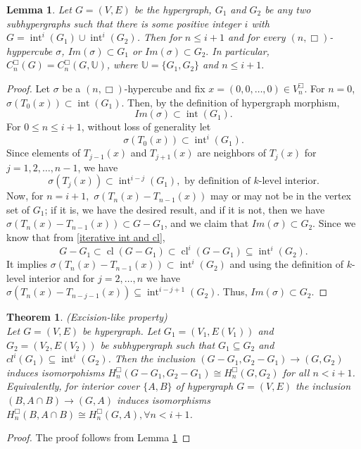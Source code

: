 \documentclass[11pt]{amsart}
\newtheorem{thm}{Theorem}[section]
\newtheorem{lem}[subsection]{Lemma}
\newcommand{\cl}{\operatorname{cl}}
\renewcommand{\int}{\operatorname{int}}
\begin{document}
\begin{lem}\label{lemma box excision-like}
Let $G=(V,E)$ be the hypergraph, $G_1$ and $G_2$ be any two subhypergraphs such that there is some positive integer $i$ with  $G=\int^i(G_1)\cup \int^i(G_2)$. Then for $n\leq i+1$ and for every $(n,\Box)$-hyppercube $\sigma$, $Im(\sigma)\subset G_1$ or $Im(\sigma) \subset G_2.$ In particular, $C_n^\Box(G)=C_n^\Box(G,\mathbb{U})$, where $\mathbb{U}=\{G_1,G_2\}$ and $n\leq i+1.$
\end{lem}
\begin{proof}
Let $\sigma$ be a $(n,\Box)$-hypercube and fix $x=(0,0,\ldots,0) \in V_n^\Box$. For $n=0$,  $\sigma(T_0(x)) \subset   \int(G_1)$.  
Then, by the definition of hypergraph morphism,
\[
 {Im}(\sigma) \subset   \int(G_1).
\]
For $0 \le n \le i+1$, without loss of generality let
\[ \sigma(T_0(x)) \subset   \int^i(G_1). \]
Since elements of $T_{j-1}(x)$ and $T_{j+1}(x)$ are neighbors of $T_j(x)$ for $j=1,2,\ldots, n-1 $, we have
\[
\sigma(T_j(x)) \subset   \int^{i-j}(G_1), \text{ by definition of $k$-level interior}.\]
Now, for $n=i+1,$ $\sigma(T_n(x)-T_{n-1}(x))$ may or may not be in the vertex set of $G_1$; if it is, we have the desired result, and if it is not, then we have $\sigma(T_n(x)-T_{n-1}(x))\subset G-G_1$, and we claim that $Im(\sigma)\subset G_2$. Since we know that from \ref{iterative int and cl}, \[G-G_1\subset \cl(G-G_1)\subset \cl^i(G-G_1)\subseteq \int^i(G_2).\] It implies $\sigma(T_n(x)-T_{n-1}(x))\subset \int^i(G_2)$ and using the definition of $k$-level interior and for  $j=2,\ldots,n$ we have $\sigma(T_{n}(x)-T_{n-j-1}(x))\subseteq \int^{i-j+1}(G_2)$. Thus, $Im(\sigma)\subset G_2$.
\end{proof}

\begin{thm}
(Excision-like property)\\
Let $G=(V,E)$ be hypergraph. Let $G_1=(V_1,E(V_1))$ and $G_2=(V_2,E(V_2))$ be subhypergraph such that $G_1\subseteq G_2$ and $cl^i(G_1)\subseteq  \int^i(G_2)$. Then the inclusion $(G-G_1,G_2-G_1)\rightarrow (G,G_2)$ induces isomorpohisms $H_{n}^\Box(G-G_1,G_2-G_1)\cong H_{n}^\Box(G,G_2)$ for all $n< i+1$. Equivalently, for interior cover $\{A,B\}$ of hypergraph $G=(V,E)$ the inclusion $(B,A\cap B)\rightarrow (G,A)$ induces isomorphisms $H_{n}^\Box(B,A\cap B)\cong H_{n}^\Box(G,A), \forall n<i+1$.
\end{thm}

\begin{proof}
The proof follows from Lemma \ref{lemma box excision-like}
\end{proof}
\end{document}
